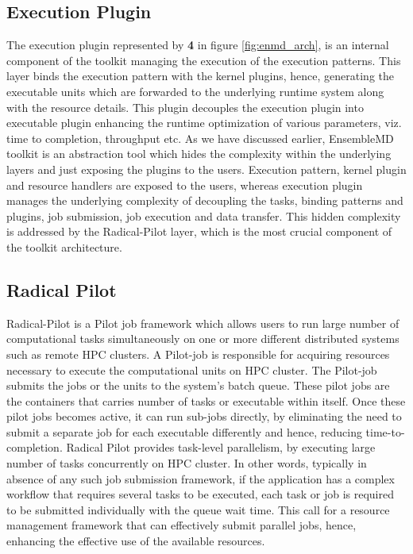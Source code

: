 \documentclass[10pt]{ruthesis}
\begin{document}
\subsection{Execution Plugin}
The execution plugin represented by \textbf{{4}} in figure \ref{fig:enmd_arch}, is an internal component of the toolkit managing the execution of the execution patterns. This layer binds the execution pattern with the kernel plugins, hence, generating the executable units which are forwarded to the underlying runtime system along with the resource details. This plugin decouples the execution plugin into executable plugin enhancing the runtime optimization of various parameters, viz. time to completion, throughput etc. 
As we have discussed earlier, EnsembleMD toolkit is an abstraction tool which hides the complexity within the underlying layers and just exposing the plugins to the users. Execution pattern, kernel plugin and resource handlers are exposed to the users, whereas execution plugin manages the underlying complexity of decoupling the tasks, binding patterns and plugins, job submission, job execution and data transfer. This hidden complexity is addressed by the Radical-Pilot layer, which is the most crucial component of the toolkit architecture. 

\subsection{Radical Pilot}
Radical-Pilot is a Pilot job framework which allows users to run large number of computational tasks simultaneously on one or more different distributed systems such as remote HPC clusters. A Pilot-job is responsible for acquiring resources necessary to execute the computational units on HPC cluster. The Pilot-job submits the jobs or the units to the system's batch queue. These pilot jobs are the containers that carries number of tasks or executable within itself. Once these pilot jobs becomes active, it can run sub-jobs directly, by eliminating the need to submit a separate job for each executable differently and hence, reducing time-to-completion. Radical Pilot provides task-level parallelism, by executing large number of tasks concurrently on HPC cluster. In other words, typically in absence of any such job submission framework, if the application has a complex workflow that requires several tasks to be executed, each task or job is required to be submitted individually with the queue wait time. This call for a resource management framework that can effectively submit parallel jobs, hence, enhancing the effective use of the available resources.
\end{document}
